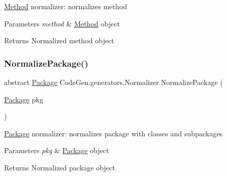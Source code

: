 \mbox{\hyperlink{classCodeGen_1_1generators_1_1Method}{Method}} normalizer\+: normalizes method 


\begin{DoxyParams}{Parameters}
{\em method} & \mbox{\hyperlink{classCodeGen_1_1generators_1_1Method}{Method}} object\\
\hline
\end{DoxyParams}
\begin{DoxyReturn}{Returns}
Normalized method object
\end{DoxyReturn}
\mbox{\label{classCodeGen_1_1generators_1_1Normalizer_a24212f04a2ed558c46ac62e23efcf0ae}} 
\subsubsection{\texorpdfstring{Normalize\+Package()}{NormalizePackage()}}
{\footnotesize\ttfamily abstract \mbox{\hyperlink{classCodeGen_1_1generators_1_1Package}{Package}} Code\+Gen.\+generators.\+Normalizer.\+Normalize\+Package (\begin{DoxyParamCaption}\item[{\mbox{\hyperlink{classCodeGen_1_1generators_1_1Package}{Package}}}]{pkg }\end{DoxyParamCaption})\hspace{0.3cm}{\ttfamily [pure virtual]}}



\mbox{\hyperlink{classCodeGen_1_1generators_1_1Package}{Package}} normalizer\+: normalizes package with classes and subpackages 


\begin{DoxyParams}{Parameters}
{\em pkg} & \mbox{\hyperlink{classCodeGen_1_1generators_1_1Package}{Package}} object\\
\hline
\end{DoxyParams}
\begin{DoxyReturn}{Returns}
Normalized package object
\end{DoxyReturn}
\mbox{\label{classCodeGen_1_1generators_1_1Normalizer_a981da1c9b6b487ba3043e538a4991000}} 
